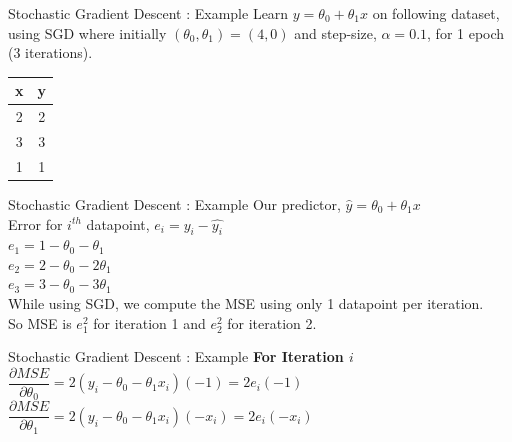 \documentclass{beamer}
\begin{document}
		

\begin{frame}{Stochastic Gradient Descent : Example}
Learn $y = \theta_0 + \theta_1 x$ on following dataset, using SGD where initially $(\theta_0, \theta_1) = (4,0)$ and step-size, $\alpha  = 0.1$, for 1 epoch (3 iterations). 
\begin{table}[]
	\centering
	\label{tab:my-table}
	\begin{tabular}{|c|c|}
		\hline
		\textbf{x} & \textbf{y} \\ \hline
		2 & 2 \\ \hline
		3 & 3 \\ \hline
		1 & 1 \\ \hline
	\end{tabular}
\end{table}
\end{frame}

\begin{frame}{Stochastic Gradient Descent : Example}
Our predictor, $\hat{y} = \theta_0 + \theta_1x$\\
\vspace{1cm}
Error for $i^{th}$ datapoint, $e_i = y_i - \hat{y_i}$\\
$e_1 = 1 - \theta_0 - \theta_1$ \\
$e_2 = 2 - \theta_0 - 2\theta_1$ \\
$e_3 = 3 - \theta_0 - 3\theta_1$ \\

\vspace{1cm}
While using SGD, we compute the MSE using only 1 datapoint per iteration. \\
So MSE is $e_1^2$ for iteration 1 and $e_2^2$ for iteration 2.
\end{frame}


\begin{frame}{Stochastic Gradient Descent : Example}
\textbf{For Iteration $i$}\\
\vspace{1cm}
$\dfrac{\partial MSE}{\partial \theta_0} = 2\left( y_i - \theta_0 -\theta_1x_i \right)\left(-1\right) = 2e_i\left(-1\right)$ \\
\vspace{2cm}
$\dfrac{\partial MSE}{\partial \theta_1} = 2\left( y_i - \theta_0 -\theta_1x_i \right)\left(-x_i\right) = 2e_i\left(-x_i\right)$ 
\end{frame}
\end{document}
